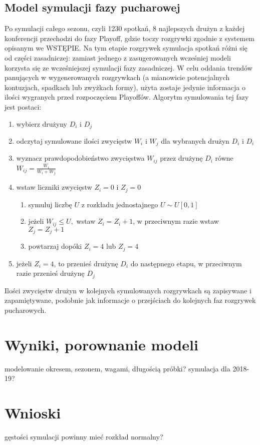 \documentclass[inzynierska]{pwr_wmat_praca_dyplomowa}
\theoremstyle{plain}
\numberwithin{theorem}{chapter}
\theoremstyle{definition}
\numberwithin{theorem}{chapter}
\begin{document}
\section{Model symulacji fazy pucharowej}
Po symulacji całego sezonu, czyli 1230 spotkań, 8 najlepszych drużyn z każdej konferencji przechodzi do fazy Playoff, gdzie toczy rozgrywki zgodnie z systemem opisanym we WSTĘPIE. Na tym etapie rozgrywek symulacja spotkań różni się od części zasadniczej: zamiast jednego z zasugerowanych wcześniej modeli korzysta się ze wcześniejszej symulacji fazy zasadniczej. W celu oddania trendów panujących w wygenerowanych rozgrywkach (a mianowicie potencjalnych kontuzjach, spadkach lub zwyżkach formy), użyta zostaje jedynie informacja o ilości wygranych przed rozpoczęciem Playoffów. Algorytm symulowania tej fazy jest postaci:
\begin{enumerate}
	\item wybierz drużyny $D_i$ i $D_j$
	\item odczytaj symulowane ilości zwycięstw $W_i$ i $W_j$ dla wybranych drużyn $D_i$ i $D_i$
	\item wyznacz prawdopodobieństwo zwycięstwa $W_{ij}$ przez drużynę  $D_i$ równe $W_{ij}=\frac{W_i}{W_i + W_j}$ 
	\item wstaw liczniki zwycięstw $Z_i=0$ i $Z_j=0$ 
		\begin{enumerate}
			\item symuluj liczbę $U$ z rozkładu jednostajnego $U\sim U[0,1]$ 
			\item jeżeli $W_{ij} \leq U,$ wstaw $Z_i=Z_i+1$, w przeciwnym razie wstaw $Z_j=Z_j+1$
			\item powtarzaj dopóki  $Z_i=4$ lub $Z_j=4$
		\end{enumerate}
	\item jeżeli $Z_i=4$, to przenieś drużynę $D_i$ do następnego etapu, w przeciwnym razie przenieś drużynę $D_j$
\end{enumerate} 

Ilości zwycięstw drużyn w kolejnych symulowanych rozgrywkach są zapisywane i zapamiętywane, podobnie jak informacje o przejściach do kolejnych faz rozgrywek pucharowych. 


\chapter{Wyniki, porownanie modeli}
modelowanie okresem, sezonem, wagami, długością próbki?
symulacja dla 2018-19?
\chapter{Wnioski}
gęstości symulacji powinny mieć rozkład normalny?
\end{document}
